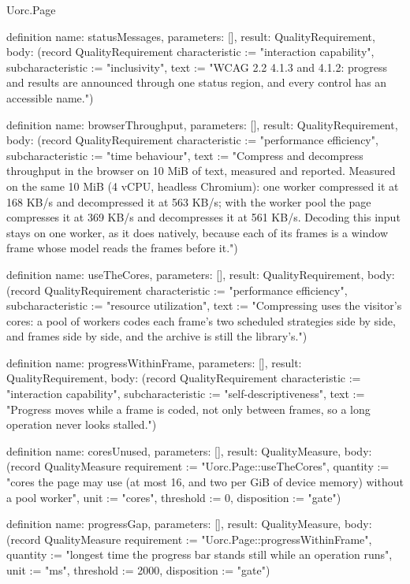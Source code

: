 \begin{lexlean}{Uorc.Page}
\begin{semanticmodule}
definition{
  name: statusMessages,
  parameters: [],
  result: QualityRequirement,
  body: (record QualityRequirement {characteristic := "interaction capability", subcharacteristic := "inclusivity", text := "WCAG 2.2 4.1.3 and 4.1.2: progress and results are announced through one status region, and every control has an accessible name."})
}

definition{
  name: browserThroughput,
  parameters: [],
  result: QualityRequirement,
  body: (record QualityRequirement {characteristic := "performance efficiency", subcharacteristic := "time behaviour", text := "Compress and decompress throughput in the browser on 10 MiB of text, measured and reported. Measured on the same 10 MiB (4 vCPU, headless Chromium): one worker compressed it at 168 KB/s and decompressed it at 563 KB/s; with the worker pool the page compresses it at 369 KB/s and decompresses it at 561 KB/s. Decoding this input stays on one worker, as it does natively, because each of its frames is a window frame whose model reads the frames before it."})
}

definition{
  name: useTheCores,
  parameters: [],
  result: QualityRequirement,
  body: (record QualityRequirement {characteristic := "performance efficiency", subcharacteristic := "resource utilization", text := "Compressing uses the visitor's cores: a pool of workers codes each frame's two scheduled strategies side by side, and frames side by side, and the archive is still the library's."})
}

definition{
  name: progressWithinFrame,
  parameters: [],
  result: QualityRequirement,
  body: (record QualityRequirement {characteristic := "interaction capability", subcharacteristic := "self-descriptiveness", text := "Progress moves while a frame is coded, not only between frames, so a long operation never looks stalled."})
}

definition{
  name: coresUnused,
  parameters: [],
  result: QualityMeasure,
  body: (record QualityMeasure {requirement := "Uorc.Page::useTheCores", quantity := "cores the page may use (at most 16, and two per GiB of device memory) without a pool worker", unit := "cores", threshold := 0, disposition := "gate"})
}

definition{
  name: progressGap,
  parameters: [],
  result: QualityMeasure,
  body: (record QualityMeasure {requirement := "Uorc.Page::progressWithinFrame", quantity := "longest time the progress bar stands still while an operation runs", unit := "ms", threshold := 2000, disposition := "gate"})
}


\end{semanticmodule}
\end{lexlean}
